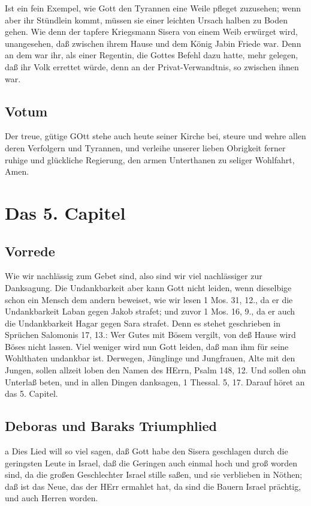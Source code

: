 Ist ein fein Exempel, wie Gott den Tyrannen eine Weile pfleget zuzusehen; wenn aber ihr Stündlein kommt, müssen sie einer leichten Ursach halben zu Boden gehen. Wie denn der tapfere Kriegsmann Sisera von einem Weib erwürget wird, unangesehen, daß zwischen ihrem Hause und dem König Jabin Friede war.
Denn an dem war ihr, als einer Regentin, die Gottes Befehl dazu hatte, mehr gelegen, daß ihr Volk errettet würde, denn an der Privat-Verwandtnis, so zwischen ihnen war.

\section{Votum}

Der treue, gütige GOtt stehe auch heute seiner Kirche bei, steure und wehre allen deren Verfolgern und Tyrannen, und verleihe unserer lieben Obrigkeit ferner ruhige und glückliche Regierung, den armen Unterthanen zu seliger Wohlfahrt, Amen.

\chapter{Das 5. Capitel}

\section{Vorrede}

Wie wir nachlässig zum Gebet sind, also sind wir viel nachlässiger zur Danksagung. Die Undankbarkeit aber kann Gott nicht leiden, wenn dieselbige schon ein Mensch dem andern beweiset, wie wir lesen 1 Mos. 31, 12., da er die Undankbarkeit Laban gegen Jakob strafet; und zuvor 1 Mos. 16, 9., da er auch die Undankbarkeit Hagar gegen Sara strafet. Denn es stehet geschrieben in Sprüchen Salomonis 17, 13.: Wer Gutes mit Bösem vergilt, von deß Hause wird Böses nicht lassen. Viel weniger wird nun Gott leiden, daß man ihm für seine Wohlthaten undankbar ist. Derwegen, Jünglinge und Jungfrauen, Alte mit den Jungen, sollen allzeit loben den Namen des HErrn, Psalm 148, 12. Und sollen ohn Unterlaß beten, und in allen Dingen danksagen, 1 Thessal. 5, 17. Darauf höret an das 5. Capitel.

\section{Deboras und Baraks Triumphlied}

a Dies Lied will so viel sagen, daß Gott habe den Sisera geschlagen durch die geringsten Leute in Israel, daß die Geringen auch einmal hoch und groß worden sind, da die großen Geschlechter Israel stille saßen, und sie verblieben in Nöthen; daß ist das Neue, das der HErr ermahlet hat, da sind die Bauern Israel prächtig, und auch Herren worden.

